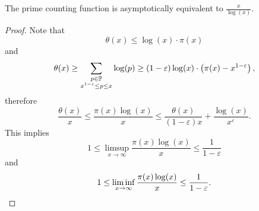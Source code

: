 \begin{izrek}
The prime counting function is asymptotically equivalent to
$\frac{x}{\log(x)}$.
\end{izrek}

\begin{proof}
Note that
\[
\theta(x) \leq \log(x) \cdot \pi(x)
\]
and
\[
\theta(x) \geq
\sum_{\substack{p \in \mathbb{P} \\ x^{1-\varepsilon} \leq p \leq x}}
\log(p) \geq
(1 - \varepsilon) \log(x) \cdot \left(\pi(x) - x^{1-\varepsilon}\right),
\]
therefore
\[
\frac{\theta(x)}{x} \leq
\frac{\pi(x) \log(x)}{x} \leq
\frac{\theta(x)}{(1-\varepsilon)x} + \frac{\log(x)}{x^\varepsilon}.
\]
This implies
\[
1 \leq
\limsup_{x \to \infty} \frac{\pi(x) \log(x)}{x} \leq
\frac{1}{1-\varepsilon}
\]
and
\[
1 \leq
\liminf_{x \to \infty} \frac{\pi(x) \log(x)}{x} \leq
\frac{1}{1-\varepsilon}. \qedhere
\]
\end{proof}
